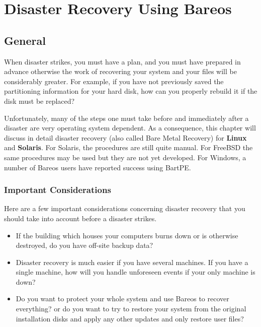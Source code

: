 
\chapter{Disaster Recovery Using Bareos}
\label{RescueChapter}

\section{General}

When disaster strikes, you must have a plan, and you must have prepared in
advance otherwise the work of recovering your system and your files will be
considerably greater.  For example, if you have not previously saved the
partitioning information for your hard disk, how can you properly rebuild
it if the disk must be replaced?

Unfortunately, many of the steps one must take before and immediately after
a disaster are very operating system dependent.  As a consequence, this
chapter will discuss in detail disaster recovery (also called Bare Metal
Recovery) for {\bf Linux} and {\bf Solaris}.  For Solaris, the procedures
are still quite manual.  For FreeBSD the same procedures may be used but
they are not yet developed.  For Windows, a number of Bareos users have
reported success using BartPE.


\subsection{Important Considerations}
\label{considerations1}

Here are a few important considerations concerning disaster recovery that
you should take into account before a disaster strikes.

\begin{itemize}
\item If the building which houses your computers burns down or is otherwise
   destroyed, do you have off-site backup data?
\item Disaster recovery is much easier if you have several machines. If  you
   have a single machine, how will you handle unforeseen events  if your only
   machine is down?
\item Do you want to protect your whole system and use Bareos to  recover
   everything? or do you want to try to restore your system from  the original
   installation disks and apply any other updates and  only restore user files?
\end{itemize}

